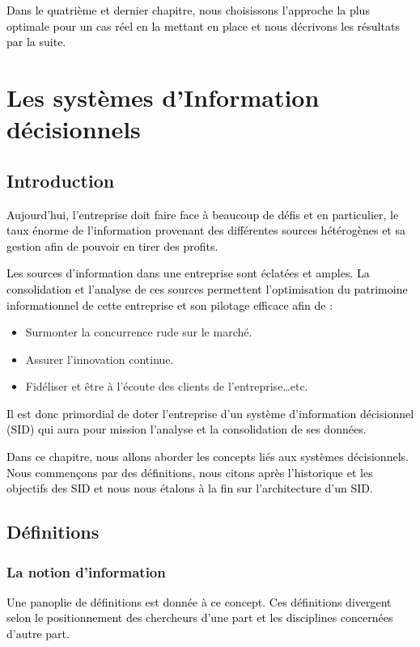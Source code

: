 \documentclass[a4paper,12pt]{report}
\begin{document}
\textcolor{black}{Dans le quatrième et dernier chapitre, nous choisissons l'approche la plus optimale pour un cas réel en la mettant en place et nous décrivons les résultats par la suite.
}




\chapter{Les systèmes d'Information décisionnels}

\section*{Introduction}
\textcolor{black}{Aujourd'hui, l'entreprise doit faire face à beaucoup de défis et en particulier, le taux énorme de l'information provenant des différentes sources hétérogènes et sa gestion afin de pouvoir en tirer des profits.} 

\textcolor{black}{Les sources d'information dans une entreprise sont éclatées et amples. La consolidation et l'analyse de ces sources permettent l’optimisation du patrimoine informationnel de cette entreprise et son pilotage efficace afin de :} 
\begin{itemize}
	\item  Surmonter la concurrence rude sur le marché.
	\item  Assurer l’innovation continue.
	\item  Fidéliser et être à l’écoute des clients de l’entreprise…etc.
\end{itemize}


\textcolor{black}{Il est donc primordial de doter l’entreprise d’un système d’information décisionnel (SID) qui aura pour mission l’analyse et la consolidation de ses données.}

\textcolor{black}{Dans ce chapitre, nous allons aborder les concepts liés aux systèmes décisionnels. Nous commençons par des définitions, nous citons après l’historique et les objectifs des SID et nous nous étalons à la fin sur l’architecture d’un SID.}
	

\section{Définitions}
\subsection{La notion d’information}
\textcolor{black}{Une panoplie de définitions est donnée à ce concept. Ces définitions divergent selon le positionnement des chercheurs d’une part et les disciplines concernées d’autre part.}
\end{document}
